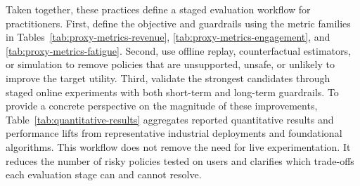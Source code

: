 \documentclass[manuscript,review,screen]{acmart}
\begin{document}
Taken together, these practices define a staged evaluation workflow for practitioners. First, define the objective and guardrails using the metric families in Tables~\ref{tab:proxy-metrics-revenue}, \ref{tab:proxy-metrics-engagement}, and \ref{tab:proxy-metrics-fatigue}. Second, use offline replay, counterfactual estimators, or simulation to remove policies that are unsupported, unsafe, or unlikely to improve the target utility. Third, validate the strongest candidates through staged online experiments with both short-term and long-term guardrails. To provide a concrete perspective on the magnitude of these improvements, Table~\ref{tab:quantitative-results} aggregates reported quantitative results and performance lifts from representative industrial deployments and foundational algorithms. This workflow does not remove the need for live experimentation. It reduces the number of risky policies tested on users and clarifies which trade-offs each evaluation stage can and cannot resolve.
\end{document}
